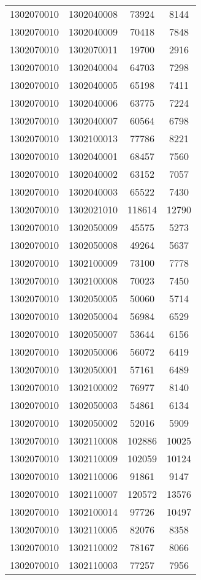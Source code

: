 \begin{longtable}[h]{llcc}
		1302070010 & 1302040008 & 73924 & 8144\\
		1302070010 & 1302040009 & 70418 & 7848\\
		1302070010 & 1302070011 & 19700 & 2916\\
		1302070010 & 1302040004 & 64703 & 7298\\
		1302070010 & 1302040005 & 65198 & 7411\\
		1302070010 & 1302040006 & 63775 & 7224\\
		1302070010 & 1302040007 & 60564 & 6798\\
		1302070010 & 1302100013 & 77786 & 8221\\
		1302070010 & 1302040001 & 68457 & 7560\\
		1302070010 & 1302040002 & 63152 & 7057\\
		1302070010 & 1302040003 & 65522 & 7430\\
		1302070010 & 1302021010 & 118614 & 12790\\
		1302070010 & 1302050009 & 45575 & 5273\\
		1302070010 & 1302050008 & 49264 & 5637\\
		1302070010 & 1302100009 & 73100 & 7778\\
		1302070010 & 1302100008 & 70023 & 7450\\
		1302070010 & 1302050005 & 50060 & 5714\\
		1302070010 & 1302050004 & 56984 & 6529\\
		1302070010 & 1302050007 & 53644 & 6156\\
		1302070010 & 1302050006 & 56072 & 6419\\
		1302070010 & 1302050001 & 57161 & 6489\\
		1302070010 & 1302100002 & 76977 & 8140\\
		1302070010 & 1302050003 & 54861 & 6134\\
		1302070010 & 1302050002 & 52016 & 5909\\
		1302070010 & 1302110008 & 102886 & 10025\\
		1302070010 & 1302110009 & 102059 & 10124\\
		1302070010 & 1302110006 & 91861 & 9147\\
		1302070010 & 1302110007 & 120572 & 13576\\
		1302070010 & 1302100014 & 97726 & 10497\\
		1302070010 & 1302110005 & 82076 & 8358\\
		1302070010 & 1302110002 & 78167 & 8066\\
		1302070010 & 1302110003 & 77257 & 7956\\

\end{longtable}
